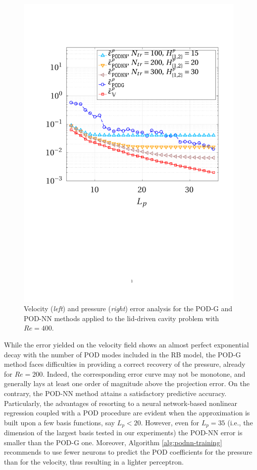 \documentclass[12pt, a4paper, twoside, openright, notitlepage]{report}
\numberwithin{equation}{chapter}
\theoremstyle{theorem}
\theoremstyle{definition}
\theoremstyle{remark}
\theoremstyle{proposition}
\numberwithin{figure}{chapter}
\begin{document}
\begin{figure}[t!]
			\includegraphics[scale = 0.44, trim = {2cm 9cm 1.5cm 3.5cm}, clip]{dc_400_p_error_vs_rank}
			
			\caption{Velocity (\emph{left}) and pressure (\emph{right}) error analysis for the POD-G and POD-NN methods applied to the lid-driven cavity problem with $Re = 400$.}
			\label{fig:dc-400-error-analysis}
		\end{figure}
				
		While the error yielded on the velocity field shows an almost perfect exponential decay with the number of POD modes included in the RB model, the POD-G method faces difficulties in providing a correct recovery of the pressure, already for $Re = 200$. Indeed, the corresponding error curve may not be monotone, and generally lays at least one order of magnitude above the projection error. On the contrary, the POD-NN method attains a satisfactory predictive accuracy. Particularly, the advantages of resorting to a neural network-based nonlinear regression coupled with a POD procedure are evident when the approximation is built upon a few basis functions, say $L_p < 20$. However, even for $L_p = 35$ (i.e., the dimension of the largest basis tested in our experiments) the POD-NN error is smaller than the POD-G one. Moreover, Algorithm \ref{alg:podnn-training} recommends to use fewer neurons to predict the POD coefficients for the pressure than for the velocity, thus resulting in a lighter perceptron. 
		
\end{document}
